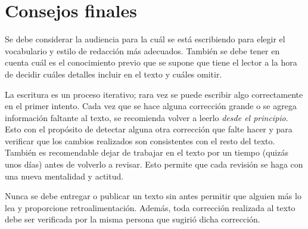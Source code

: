 


\section{Consejos finales}

Se debe considerar la audiencia para la cuál se está escribiendo para elegir el vocabulario y estilo de redacción más adecuados.
También se debe tener en cuenta cuál es el conocimiento previo que se supone que tiene el lector a la hora de decidir cuáles detalles incluir en el texto y cuáles omitir.

La escritura es un proceso iterativo; rara vez se puede escribir algo correctamente en el primer intento. 
Cada vez que se hace alguna corrección grande o se agrega información faltante al texto, se recomienda volver a leerlo \emph{desde el principio}.
Esto con el propósito de detectar alguna otra corrección que falte hacer y para verificar que los cambios realizados son consistentes con el resto del texto.
También es recomendable dejar de trabajar en el texto por un tiempo (quizás unos días) antes de volverlo a revisar.
Esto permite que cada revisión se haga con una nueva mentalidad y actitud.

Nunca se debe entregar o publicar un texto sin antes permitir que alguien más lo lea y proporcione retroalimentación.
Además, toda corrección realizada al texto debe ser verificada por la misma persona que sugirió dicha corrección. 

